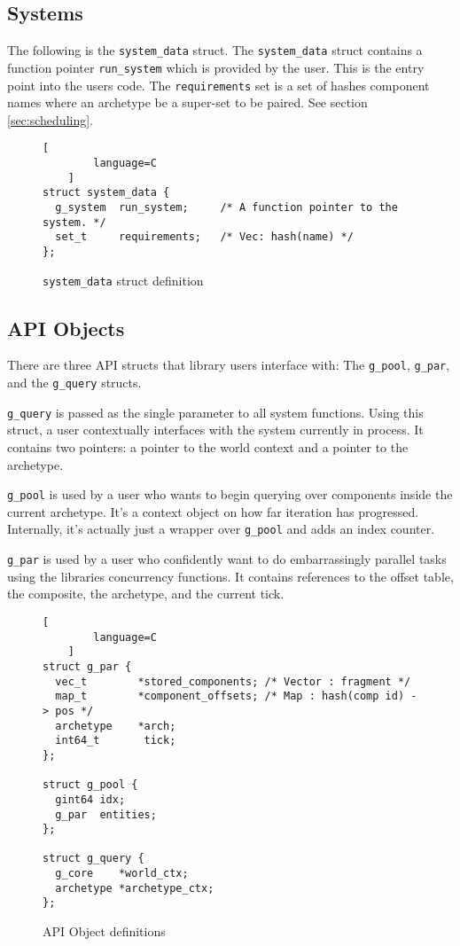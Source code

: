 \subsection{Systems}
The following is the \texttt{system\_data} struct. The \texttt{system\_data} struct contains a function pointer \texttt{run\_system} which is provided by the user. This is the entry point into the users code. The \texttt{requirements} set is a set of hashes component names where an archetype be a super-set to be paired. See section \ref{sec:scheduling}.

\begin{figure}[H]
    \begin{lstlisting}[
        language=C
    ]
struct system_data {
  g_system  run_system;     /* A function pointer to the system. */
  set_t     requirements;   /* Vec: hash(name) */
};
    \end{lstlisting}
    \caption{\texttt{system\_data} struct definition}
    \label{code:sd_and_er}
\end{figure}

\subsection{API Objects}
There are three API structs that library users interface with: The \texttt{g\_pool}, \texttt{g\_par}, and the \texttt{g\_query} structs. 

\texttt{g\_query} is passed as the single parameter to all system functions. Using this struct, a user contextually interfaces with the system currently in process. It contains two pointers: a pointer to the world context and a pointer to the archetype.

\texttt{g\_pool} is used by a user who wants to begin querying over components inside the current archetype. It's a context object on how far iteration has progressed. Internally, it's actually just a wrapper over \texttt{g\_pool} and adds an index counter.

\texttt{g\_par} is used by a user who confidently want to do embarrassingly parallel tasks using the libraries concurrency functions. It contains references to the offset table, the composite, the archetype, and the current tick.


\begin{figure}[htbp]
    \begin{lstlisting}[
        language=C
    ]
struct g_par {
  vec_t        *stored_components; /* Vector : fragment */
  map_t        *component_offsets; /* Map : hash(comp id) -> pos */
  archetype    *arch;
  int64_t       tick;
};

struct g_pool {
  gint64 idx;
  g_par  entities;
};

struct g_query {
  g_core    *world_ctx;
  archetype *archetype_ctx;
};
    \end{lstlisting}
    \caption{API Object definitions}
    \label{code:apis}
\end{figure}

